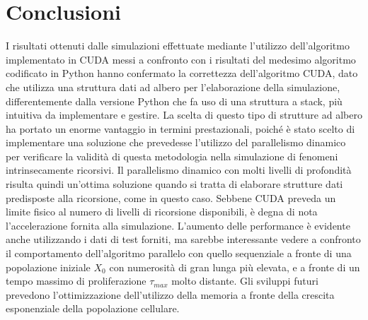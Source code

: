 
\chapter{Conclusioni} %

\label{Conclusioni} %



I risultati ottenuti dalle simulazioni effettuate mediante
l'utilizzo dell'algoritmo implementato in CUDA messi a confronto con i
risultati del medesimo algoritmo codificato in Python hanno confermato
la correttezza dell'algoritmo CUDA, dato che utilizza una struttura dati
ad albero per l'elaborazione della simulazione, differentemente dalla versione
Python che fa uso di una struttura a stack, più intuitiva da implementare e
gestire. La scelta di questo tipo di strutture ad albero ha portato un enorme
vantaggio in termini prestazionali, poiché è stato scelto di implementare
una soluzione che prevedesse l'utilizzo del parallelismo dinamico per
verificare la validità di questa metodologia nella simulazione di fenomeni
intrinsecamente ricorsivi. Il parallelismo dinamico con molti livelli
di profondità risulta quindi un'ottima soluzione quando si tratta di elaborare
strutture dati predisposte alla ricorsione, come in questo caso. Sebbene CUDA
preveda un limite fisico al numero di livelli di ricorsione disponibili, è
degna di nota l'accelerazione fornita alla simulazione.
L'aumento delle performance è evidente anche utilizzando i dati di test
forniti, ma sarebbe interessante vedere a confronto il comportamento
dell'algoritmo parallelo con quello sequenziale a fronte di una popolazione
iniziale $X_{0}$ con numerosità di gran lunga più elevata, e a fronte
di un tempo massimo di proliferazione $\tau_{max}$ molto distante.
Gli sviluppi futuri prevedono l'ottimizzazione dell'utilizzo della memoria
a fronte della crescita esponenziale della popolazione cellulare.
